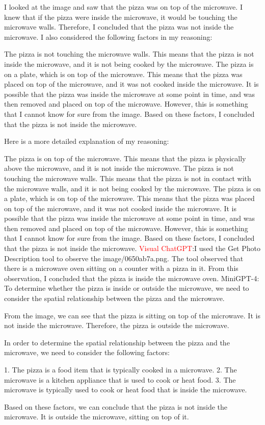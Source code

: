 \begin{enumerate}
        I looked at the image and saw that the pizza was on top of the microwave.
        I knew that if the pizza were inside the microwave, it would be touching the microwave walls.
        Therefore, I concluded that the pizza was not inside the microwave.
        I also considered the following factors in my reasoning:
        
        The pizza is not touching the microwave walls. This means that the pizza is not inside the microwave, and it is not being cooked by the microwave.
        The pizza is on a plate, which is on top of the microwave. This means that the pizza was placed on top of the microwave, and it was not cooked inside the microwave.
        It is possible that the pizza was inside the microwave at some point in time, and was then removed and placed on top of the microwave. However, this is something that I cannot know for sure from the image.
        Based on these factors, I concluded that the pizza is not inside the microwave.
        
        Here is a more detailed explanation of my reasoning:
        
        The pizza is on top of the microwave. This means that the pizza is physically above the microwave, and it is not inside the microwave.
        The pizza is not touching the microwave walls. This means that the pizza is not in contact with the microwave walls, and it is not being cooked by the microwave.
        The pizza is on a plate, which is on top of the microwave. This means that the pizza was placed on top of the microwave, and it was not cooked inside the microwave.
        It is possible that the pizza was inside the microwave at some point in time, and was then removed and placed on top of the microwave. However, this is something that I cannot know for sure from the image.
        Based on these factors, I concluded that the pizza is not inside the microwave.
        \subitem \textcolor{red}{Visual ChatGPT}:I used the Get Photo Description tool to observe the image/0650ab7a.png. The tool observed that there is a microwave oven sitting on a counter with a pizza in it. From this observation, I concluded that the pizza is inside the microwave oven.
        \subitem MiniGPT-4: To determine whether the pizza is inside or outside the microwave, we need to consider the spatial relationship between the pizza and the microwave.

        From the image, we can see that the pizza is sitting on top of the microwave. It is not inside the microwave. Therefore, the pizza is outside the microwave.
        
        In order to determine the spatial relationship between the pizza and the microwave, we need to consider the following factors:
        
        1. The pizza is a food item that is typically cooked in a microwave.
        2. The microwave is a kitchen appliance that is used to cook or heat food.
        3. The microwave is typically used to cook or heat food that is inside the microwave.
        
        Based on these factors, we can conclude that the pizza is not inside the microwave. It is outside the microwave, sitting on top of it.
    \end{enumerate}
